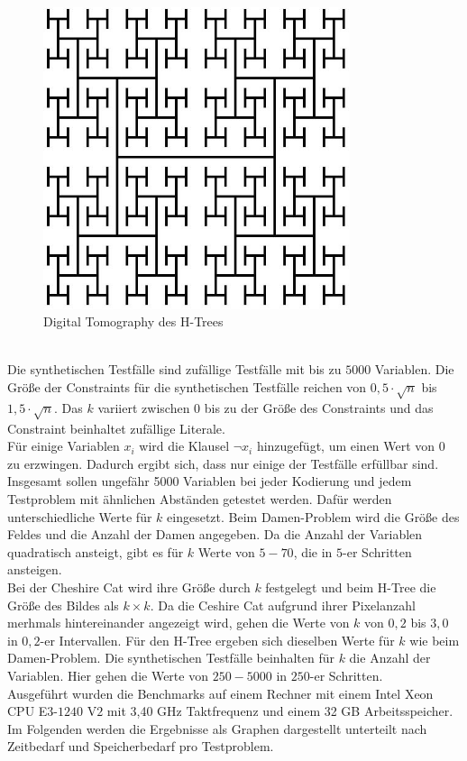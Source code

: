\documentclass[a4,abstract=on]{scrartcl}
\begin{document}
\begin{figure}[H]
\centering
\includegraphics[width=9cm]{htree.png}
\caption{Digital Tomography des H-Trees}
\label{fig:htree}
\end{figure}
\ \\
Die synthetischen Testfälle sind zufällige Testfälle mit bis zu $5000$ Variablen. Die Größe der Constraints für die synthetischen Testfälle reichen von $0,5\cdot \sqrt{n}$ bis $1,5\cdot \sqrt{n}$. Das $k$ variiert zwischen $0$ bis zu der Größe des Constraints und das Constraint beinhaltet zufällige Literale.\\
Für einige Variablen $x_i$ wird die Klausel $\neg x_i$ hinzugefügt, um einen Wert von $0$ zu erzwingen. Dadurch ergibt sich, dass nur einige der Testfälle erfüllbar sind.\\
Insgesamt sollen ungefähr 5000 Variablen bei jeder Kodierung und jedem Testproblem mit ähnlichen Abständen getestet werden. Dafür werden unterschiedliche Werte für $k$ eingesetzt. Beim Damen-Problem wird die Größe des Feldes und die Anzahl der Damen angegeben. Da die Anzahl der Variablen quadratisch ansteigt, gibt es für $k$ Werte von $5-70$, die in $5$-er Schritten ansteigen.\\
Bei der Cheshire Cat wird ihre Größe durch $k$ festgelegt und beim H-Tree die Größe des Bildes als $k \times k$. Da die Ceshire Cat aufgrund ihrer Pixelanzahl merhmals hintereinander angezeigt wird, gehen die Werte von $k$ von $0,2$ bis $3,0$ in $0,2$-er Intervallen. Für den H-Tree ergeben sich dieselben Werte für $k$ wie beim Damen-Problem.
Die synthetischen Testfälle beinhalten für $k$ die Anzahl der Variablen. Hier gehen die Werte von $250-5000$ in $250$-er Schritten.\\
Ausgeführt wurden die Benchmarks auf einem Rechner mit einem Intel Xeon CPU E$3$-$1240$ V$2$ mit 3,40 GHz Taktfrequenz und einem 32 GB Arbeitsspeicher.\\
Im Folgenden werden die Ergebnisse als Graphen dargestellt unterteilt nach Zeitbedarf und Speicherbedarf pro Testproblem.
\end{document}
